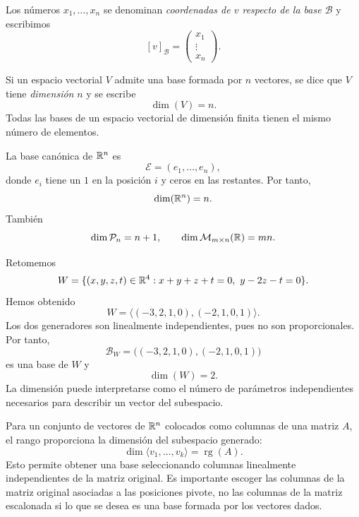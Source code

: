 Los números $x_1,\ldots,x_n$ se denominan \emph{coordenadas de $v$ respecto de la base $\mathcal B$} y escribimos
\[
[v]_{\mathcal B}
=
\begin{pmatrix}
x_1\\ \vdots\\ x_n
\end{pmatrix}.
\]

\begin{definition}[Dimensión]
Si un espacio vectorial $V$ admite una base formada por $n$ vectores, se dice que $V$ tiene \emph{dimensión} $n$ y se escribe
\[
\dim(V)=n.
\]
Todas las bases de un espacio vectorial de dimensión finita tienen el mismo número de elementos.
\end{definition}

La base canónica de $\mathbb{R}^n$ es
\[
\mathcal E=(e_1,\ldots,e_n),
\]
donde $e_i$ tiene un $1$ en la posición $i$ y ceros en las restantes. Por tanto,
\[
\dim(\mathbb{R}^n)=n.
\]
También
\[
\dim\mathcal P_n=n+1,
\qquad
\dim\mathcal M_{m\times n}(\mathbb{R})=mn.
\]

\begin{example}
Retomemos
\[
W=\{(x,y,z,t)\in\R^4:x+y+z+t=0,\ y-2z-t=0\}.
\]
Hemos obtenido
\[
W=\langle(-3,2,1,0),(-2,1,0,1)\rangle.
\]
Los dos generadores son linealmente independientes, pues no son proporcionales. Por tanto,
\[
\mathcal B_W=\bigl((-3,2,1,0),(-2,1,0,1)\bigr)
\]
es una base de $W$ y
\[
\boxed{\dim(W)=2.}
\]
La dimensión puede interpretarse como el número de parámetros independientes necesarios para describir un vector del subespacio.
\end{example}

Para un conjunto de vectores de $\mathbb{R}^n$ colocados como columnas de una matriz $A$, el rango proporciona la dimensión del subespacio generado:
\[
\boxed{
\dim\langle v_1,\ldots,v_k\rangle
=
\operatorname{rg}(A).
}
\]
Esto permite obtener una base seleccionando columnas linealmente independientes de la matriz original. Es importante escoger las columnas de la matriz original asociadas a las posiciones pivote, no las columnas de la matriz escalonada si lo que se desea es una base formada por los vectores dados.

